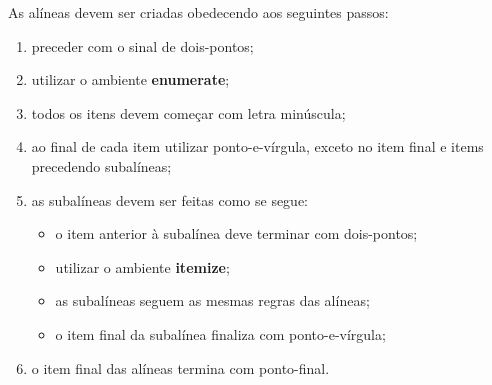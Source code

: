 As alíneas devem ser criadas obedecendo aos seguintes passos:
\begin{enumerate}
 \item preceder com o sinal de dois-pontos;
 \item utilizar o ambiente \textbf{enumerate};
 \item todos os itens devem começar com letra minúscula;
 \item ao final de cada item utilizar ponto-e-vírgula, exceto no item final e items precedendo subalíneas;
 \item as subalíneas devem ser feitas como se segue:
 \begin{itemize}
  \item o item anterior à subalínea deve terminar com dois-pontos;
  \item utilizar o ambiente \textbf{itemize};
  \item as subalíneas seguem as mesmas regras das alíneas;
  \item o item final da subalínea finaliza com ponto-e-vírgula;
 \end{itemize}
 \item o item final das alíneas termina com ponto-final.
\end{enumerate}
